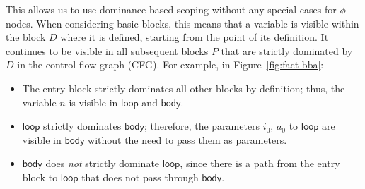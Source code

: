 \documentclass[acmsmall,screen,review]{acmart}
\newcommand{\ms}[1]{\ensuremath{\mathsf{#1}}}
\begin{document}
This allows us to use dominance-based scoping without any special cases for $\phi$-nodes.
When considering basic blocks, this means that a variable is visible within the block $D$ where it
is defined, starting from the point of its definition. It continues to be visible in all subsequent
blocks $P$ that are strictly dominated by $D$ in the control-flow graph (CFG). For example, in
Figure~\ref{fig:fact-bba}:
\begin{itemize}
  \item The entry block strictly dominates all other blocks by definition; thus, the variable $n$ is
  visible in \ms{loop} and \ms{body}.
  \item \ms{loop} strictly dominates \ms{body}; therefore, the parameters $i_0$, $a_0$ to \ms{loop}
  are visible in \ms{body} without the need to pass them as parameters.
  \item \ms{body} does \emph{not} strictly dominate \ms{loop}, since there is a path from the entry
  block to \ms{loop} that does not pass through \ms{body}.
\end{itemize}
\end{document}
